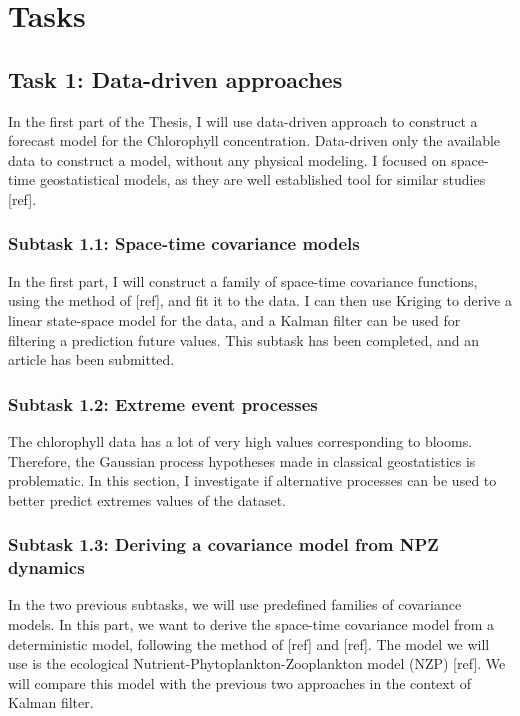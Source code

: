 

\chapter{Tasks}

	\section{Task 1: Data-driven approaches}
	\label{datadriv}

		In the first part of the Thesis, I will use data-driven approach to construct a forecast model for the Chlorophyll concentration. Data-driven only the available data to construct a model, without any physical modeling. I focused on space-time geostatistical models, as they are well established tool for similar studies [ref]. 

		\subsection{Subtask 1.1: Space-time covariance models}
		\label{datadriv:covmod}

	   		In the first part, I will construct a family of space-time covariance functions, using the method of [ref], and fit it to the data. I can then use Kriging to derive a linear state-space model for the data, and a Kalman filter can be used for filtering a prediction future values. This subtask has been completed, and an article has been submitted.

		\subsection{Subtask 1.2: Extreme event processes}
		\label{datadriv:extreme}

			The chlorophyll data has a lot of very high values corresponding to blooms. Therefore, the Gaussian process hypotheses made in classical geostatistics is problematic. In this section, I investigate if alternative processes can be used to better predict extremes values of the dataset. 

		\subsection{Subtask 1.3: Deriving a covariance model from NPZ dynamics}
		\label{datadriv:npzcov}

			In the two previous subtasks, we will use predefined families of covariance models. In this part, we want to derive the space-time covariance model from a deterministic model, following the method of [ref] and [ref]. The model we will use is the ecological Nutrient-Phytoplankton-Zooplankton model (NZP) [ref]. We will compare this model with the previous two approaches in the context of Kalman filter.

